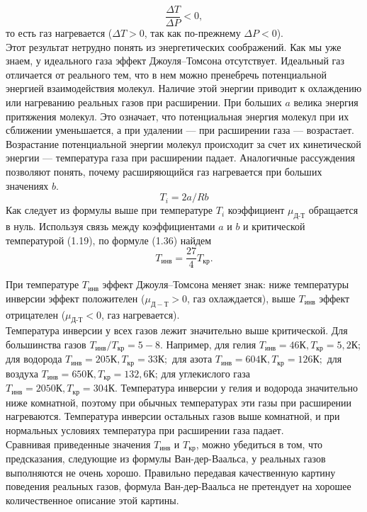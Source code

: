 \documentclass[a4paper, 12pt]{article}%
\begin{document}
	\begin{equation}
		\dfrac{\Delta T}{\Delta P} < 0,
	\end{equation}
	то есть газ нагревается ($\Delta T > 0$, так как по-прежнему $\Delta P < 0$).\\
	Этот результат нетрудно понять из энергетических соображений. Как мы уже знаем, у идеального газа эффект Джоуля–Томсона отсутствует. Идеальный газ отличается от реального тем, что в нем можно пренебречь потенциальной энергией взаимодействия молекул. Наличие этой энергии приводит к охлаждению или нагреванию реальных газов при расширении. При больших $a$ велика энергия притяжения молекул. Это означает, что потенциальная энергия молекул при их сближении уменьшается, а при удалении --- при расширении газа --- возрастает. Возрастание потенциальной энергии молекул происходит за счет их кинетической энергии --- температура газа при расширении падает. Аналогичные рассуждения позволяют понять, почему расширяющийся газ нагревается при больших значениях $b$.\\
 $$ T_i = 2a/Rb$$	Как следует из формулы выше при температуре $T_i$ коэффициент $\mu_{\text{Д-Т}} $ обращается в нуль. Используя связь между коэффициентами $a$ и $b$ и критической температурой (1.19), по формуле (1.36) найдем
	\begin{equation}
		T_{\text{инв}} = \dfrac{27}{4}T_{\text{кр}}.
	\end{equation}
	
	
	При температуре $T_{\text{инв}}$ эффект Джоуля–Томсона меняет знак: ниже температуры инверсии эффект положителен ($\mu_{Д-Т} > 0$, газ охлаждается), выше $T_{\text{инв}}$ эффект отрицателен ($\mu_{\text{Д-Т}} < 0$, газ нагревается).\\
	
	Температура инверсии у всех газов лежит значительно выше критической. Для большинства газов $T_{инв}/T_{кр} = 5-8$. Например, для гелия $T_{инв} = 46К, T_{кр} = 5,2К$; для водорода $T_{инв} = 205К, T_{кр }= 33К;$ для азота $T_{инв} = 604 К, T_{кр} = 126 К;$ для воздуха $T_{инв} = 650 К, T_{кр} = 132,6 К$; для углекислого газа $T_{инв} = 2050 К, T_{кр} = 304 К.$ Температура инверсии у гелия и водорода значительно ниже комнатной, поэтому при обычных температурах эти газы при расширении нагреваются. Температура инверсии остальных газов выше комнатной, и при нормальных условиях температура при расширении газа падает.\\
	
	Сравнивая приведенные значения $T_{инв}$ и $T_{кр}$, можно убедиться в том, что предсказания, следующие из формулы Ван-дер-Ваальса, у реальных газов выполняются не очень хорошо. Правильно передавая качественную картину поведения реальных газов, формула Ван-дер-Ваальса не претендует на хорошее количественное описание этой картины.\\
	
\end{document}
